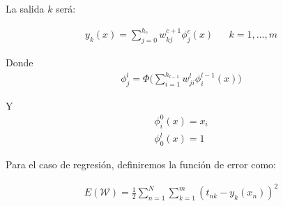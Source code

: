 La salida $k$ será:

\begin{align*}
    y_k(x) = \sum_{j = 0}^{h_c} w_{kj}^{c + 1}\phi_{j}^{c}(x) & & k = 1,\dots,m
\end{align*}

Donde
\begin{align*}
    \phi_{j}^{l} = \Phi
    \Big(
        \sum_{i = 1}^{h_{l - 1}} w_{ji}^{l}\phi_{i}^{l -1}(x)
    \Big)
\end{align*}

Y
\begin{align*}
    \phi_i^0(x) = x_i \\
    \phi_0^l(x) = 1
\end{align*}

Para el caso de regresión, definiremos la función de error como:

\begin{align*}
    E(\mathcal{W}) = \frac{1}{2}\sum_{n = 1}^{N}\sum_{k = 1}^{m} (t_{nk} - y_k(x_n))^2
\end{align*}
